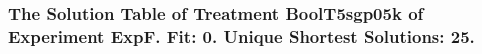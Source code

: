  \begin{frame}
 \fontsize{8pt}{9pt}\selectfont
 \frametitle{ The Solution Table of Treatment BoolT5sgp05k of Experiment ExpF. Fit: 0. Unique Shortest Solutions: 25. }

 \label{ExpFSolutionTable003.tex}  
 \end{frame}


